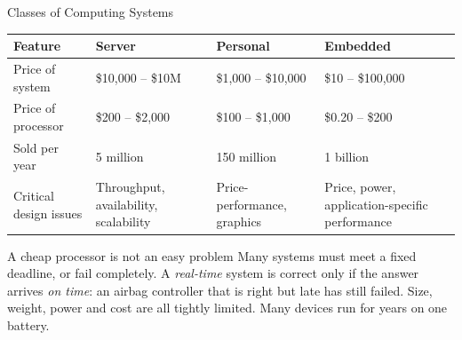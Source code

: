 \documentclass[9pt,aspectratio=169,xcolor=table]{beamer}
\begin{document}
\begin{frame}{Classes of Computing Systems}
    \begin{center}
    {\small
    \striped
    \begin{tabular}{@{}l R{.2\textwidth} R{.2\textwidth} R{.24\textwidth}@{}}
        \toprule
        \textbf{Feature} & \textbf{Server} & \textbf{Personal} & \textbf{Embedded} \\
        \midrule
        Price of system & \$10,000 -- \$10M & \$1,000 -- \$10,000 & \$10 -- \$100,000 \\
        Price of processor & \$200 -- \$2,000 & \$100 -- \$1,000 & \$0.20 -- \$200 \\
        Sold per year & 5 million & 150 million & \alert{1 billion} \\
        Critical design issues & Throughput, availability, scalability & Price-performance, graphics & Price, power, application-specific performance \\
        \bottomrule
    \end{tabular}}
    \end{center}

    \vspace{3mm}
    \begin{block}{A cheap processor is not an easy problem}
        Many systems must meet a \alert{fixed deadline}, or fail completely. A \emph{real-time} system is correct only if the answer arrives \emph{on time}: an airbag controller that is right but late has still failed. Size, weight, power and cost are all tightly limited. Many devices run for years on one battery.
    \end{block}
\end{frame}
\end{document}
